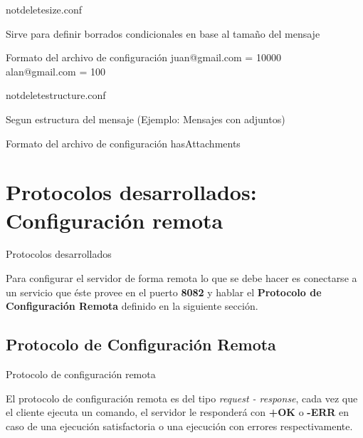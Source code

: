\documentclass{beamer}
\begin{document}
\begin{frame}{notdelete\textunderscore size.conf}

\par Sirve para definir borrados condicionales en base al tamaño del mensaje\\[0.5cm]

\begin{block}{Formato del archivo de configuración}
juan@gmail.com = 10000\\
alan@gmail.com = 100\\
\end{block}

\end{frame}

\begin{frame}{notdelete\textunderscore structure.conf}

\par Segun estructura del mensaje (Ejemplo: Mensajes con adjuntos)\\[0.5cm]

\begin{block}{Formato del archivo de configuración}
hasAttachments\\
\end{block}

\end{frame}


\section{Protocolos desarrollados: Configuración remota}

\begin{frame}{Protocolos desarrollados}

\par Para configurar el servidor de forma remota lo que se debe hacer es conectarse a un servicio que éste provee en el puerto \textbf{8082} y hablar el \textbf{Protocolo de Configuración Remota} definido en la siguiente sección.

\end{frame}

\subsection{Protocolo de Configuración Remota}

\begin{frame}{Protocolo de configuración remota}

\par El protocolo de configuración remota es del tipo \textit{request - response}, cada vez que el cliente ejecuta un comando, el servidor le responderá con \textbf{+OK} o \textbf{-ERR} en caso de una ejecución satisfactoria o una ejecución con errores respectivamente.

\end{frame}
\end{document}
